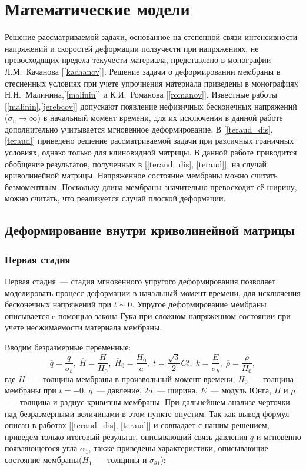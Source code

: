 \chapter{Математические модели}
Решение рассматриваемой задачи, основанное на степенной связи интенсивности напряжений и скоростей деформации ползучести при напряжениях, не превосходящих предела текучести материала, представлено в монографии Л.М.~Качанова [\ref{kachanov}].
Решение задачи о деформировании мембраны в стесненных условиях при учете упрочнения материала приведены в монографиях Н.Н.~Малинина,[\ref{malinin}] и К.И.~Романова [\ref{romanov}]. Известные работы [\ref{malinin},\ref{jerebcov}] допускают появление нефизичных бесконечных напряжений ($\sigma_u \to \infty$) в начальный момент времени, для их исключения в данной работе дополнительно учитывается мгновенное деформирование.
В [\ref{teraud_dis}, \ref{teraud}] приведено решение рассматриваемой задачи при различных граничных условиях, однако только для клиновидной матрицы. В данной работе приводится обобщение результатов, полученных в [\ref{teraud_dis}, \ref{teraud}], на случай криволинейной матрицы. Напряженное состояние мембраны можно считать безмоментным. Поскольку длина мембраны значительно превосходит её ширину, можно считать, что реализуется случай плоской деформации.

\section{Деформирование внутри криволинейной матрицы \label{section_1_1}}

	\subsection{Первая стадия}

Первая стадия~--- стадия мгновенного упругого деформирования позволяет моделировать процесс деформации в начальный момент времени, для исключения бесконечных
	напряжений при $t \sim 0$.
	Упругое деформирование мембраны описывается c помощью закона Гука при сложном напряженном состоянии при учете несжимаемости материала мембраны.
	
	
	Вводим безразмерные переменные:
	\begin{equation}
		\overline{q} = \dfrac{q}{\sigma_b}, \;
		\overline{H} = \dfrac{H}{H_0}, \;
		\overline{H}_0 = \dfrac{H_0}{a}, \;
		\overline{t} = \dfrac{\sqrt 3}{2}Ct,\;
		k = \dfrac{E}{\sigma_b},\;
		\overline{\rho} = \dfrac{\rho}{H_0},
	\end{equation}
	где $H$ ~--- толщина мембраны в произвольный момент времени, $H_0$~--- толщина мембраны при $t = -0$, $q$~--- давление, $2a$~--- ширина,
	$E$~--- модуль Юнга,  $H$ и  $\rho$~--- толщина и радиус кривизны мембраны.
	При дальнейшем анализе черточки над безразмерными величинами в этом пункте  опустим. Так как вывод формул описан в работах  [\ref{teraud_dis}, \ref{teraud}]
	и совпадает с нашим решением, приведем только итоговый результат, описывающий связь давления $q$ и мгновенно появляющегося угла $\alpha_1$,
	также приведены характеристики, описывающие состояние мембраны($H_1$~--- толщины и $\sigma_{\theta1}$):

